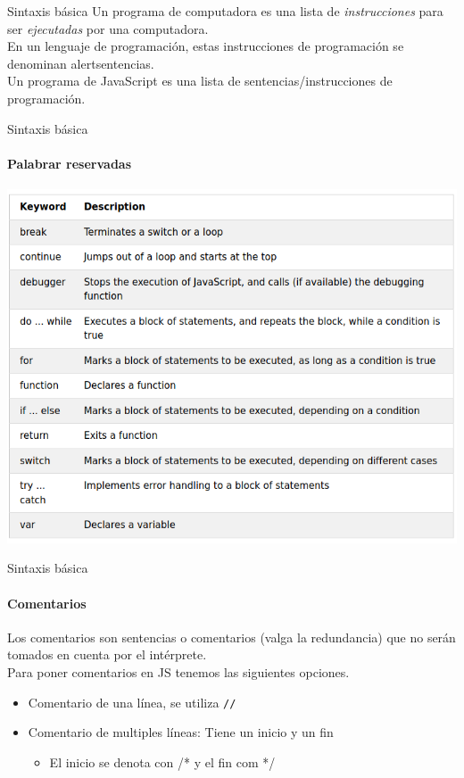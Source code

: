 \documentclass[aspectratio=169]{beamer}
\begin{document}
\begin{darkframes}
\begin{frame}{Sintaxis básica}
      Un programa de computadora es una lista de \textit{instrucciones} para ser \textit{ejecutadas} por una computadora.\\

      En un lenguaje de programación, estas instrucciones de programación se denominan alert{sentencias}.\\

      Un programa de JavaScript es una lista de sentencias/instrucciones de programación.\\
    \end{frame}

    \begin{frame}{Sintaxis básica}
      \framesubtitle{Palabrar reservadas}
      \begin{center}
        \includegraphics[width=.6\textwidth]{reservadas}
      \end{center}
    \end{frame}

    \begin{frame}{Sintaxis básica}
      \framesubtitle{Comentarios}
      Los comentarios son sentencias o comentarios (valga la redundancia) que no serán tomados en cuenta por el intérprete.\\

      Para poner comentarios en JS tenemos las siguientes opciones.
      \begin{itemize}
        \item Comentario de una línea, se utiliza \texttt{//}
        \item Comentario de multiples líneas: Tiene un inicio y un fin
        \begin{itemize}
          \item El inicio se denota con /* y el fin com */
        \end{itemize}
      \end{itemize}
    \end{frame}


\end{darkframes}
\end{document}
